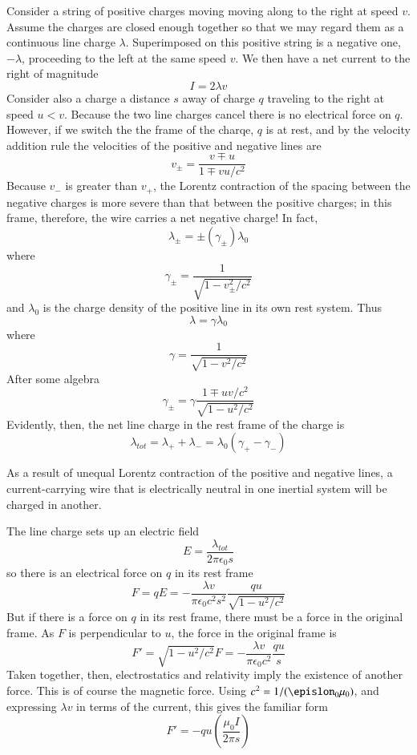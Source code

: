 Consider a string of positive charges moving moving along to the right at speed $v$. Assume the charges are closed enough together so that we may regard them as a continuous line charge $\lambda$. Superimposed on this positive string is a negative one, $-\lambda$, proceeding to the left at the same speed $v$. We then have a net current to the right of magnitude $$I = 2\lambda v$$
Consider also a charge a distance $s$ away of charge $q$ traveling to the right at speed $u < v$. Because the two line charges cancel there is no electrical force on $q$. However, if we switch the the frame of the charqe, $q$ is at rest, and by the velocity addition rule the velocities of the positive and negative lines are $$v_{\pm} = \frac{v\mp u}{1\mp vu/c^2}$$
Because $v_-$ is greater than $v_+$, the Lorentz contraction of the spacing between the negative charges is more severe than that between the positive charges; in this frame, therefore, the wire carries a net negative charge! In fact, $$\lambda_{\pm} = \pm(\gamma_{\pm})\lambda_0$$
where $$\gamma_{\pm} = \frac{1}{\sqrt{1-v_{\pm}^2/c^2}}$$
and $\lambda_0$ is the charge density of the positive line in its own rest system. Thus $$\lambda = \gamma \lambda_0$$ where $$\gamma = \frac{1}{\sqrt{1-v^2/c^2}}$$
After some algebra \begin{equation*}
    \gamma_{\pm} = \gamma \frac{1\mp uv/c^2}{\sqrt{1-u^2/c^2}}
\end{equation*}
Evidently, then, the net line charge in the rest frame of the charge is $$\lambda_{tot} = \lambda_+ + \lambda_- = \lambda_0(\gamma_+-\gamma_-)$$
\begin{rmk}
    As a result of unequal Lorentz contraction of the positive and negative lines, a current-carrying wire that is electrically neutral in one inertial system will be charged in another.
\end{rmk}

The line charge sets up an electric field $$E = \frac{\lambda_{tot}}{2\pi \epsilon_0s}$$
so there is an electrical force on $q$ in its rest frame $$F = qE = -\frac{\lambda v}{\pi\epsilon_0c^2s^2}\frac{qu}{\sqrt{1-u^2/c^2}}$$
But if there is a force on $q$ in its rest frame, there must be a force in the original frame. As $F$ is perpendicular to $u$, the force in the original frame is $$F' = \sqrt{1-u^2/c^2}F = -\frac{\lambda v}{\pi\epsilon_0c^2}\frac{qu}{s}$$
Taken together, then, electrostatics and relativity imply the existence of another force. This is of course the magnetic force. Using $c^2 = 1/(\epislon_0\mu_0)$, and expressing $\lambda v$ in terms of the current, this gives the familiar form $$F' = -qu\left(\frac{\mu_0I}{2\pi s}\right)$$


